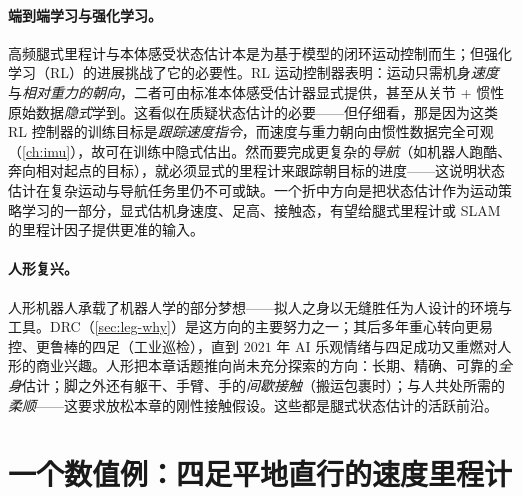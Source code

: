 \paragraph{端到端学习与强化学习。}
高频腿式里程计与本体感受状态估计本是为基于模型的闭环运动控制而生；但强化学习（RL）的进展挑战了它的必要性。RL 运动控制器表明：运动只需机身\emph{速度}与\emph{相对重力的朝向}，二者可由标准本体感受估计器显式提供，甚至从关节 + 惯性原始数据\emph{隐式}学到\cite{carlone2026handbook}。这看似在质疑状态估计的必要——但仔细看，那是因为这类 RL 控制器的训练目标是\emph{跟踪速度指令}，而速度与重力朝向由惯性数据完全可观（\cref{ch:imu}），故可在训练中隐式估出。然而要完成更复杂的\emph{导航}（如机器人跑酷、奔向相对起点的目标），就必须显式的里程计来跟踪朝目标的进度——这说明状态估计在复杂运动与导航任务里仍不可或缺。一个折中方向是把状态估计作为运动策略学习的一部分，显式估机身速度、足高、接触态，有望给腿式里程计或 SLAM 的里程计因子提供更准的输入。

\paragraph{人形复兴。}
人形机器人承载了机器人学的部分梦想——拟人之身以无缝胜任为人设计的环境与工具。DRC（\cref{sec:leg-why}）是这方向的主要努力之一；其后多年重心转向更易控、更鲁棒的四足（工业巡检），直到 $2021$ 年 AI 乐观情绪与四足成功又重燃对人形的商业兴趣。人形把本章话题推向尚未充分探索的方向：长期、精确、可靠的\emph{全身}估计；脚之外还有躯干、手臂、手的\emph{间歇接触}（搬运包裹时）；与人共处所需的\emph{柔顺}——这要求放松本章的刚性接触假设。这些都是腿式状态估计的活跃前沿。

\section{一个数值例：四足平地直行的速度里程计}
\label{sec:leg-example}

